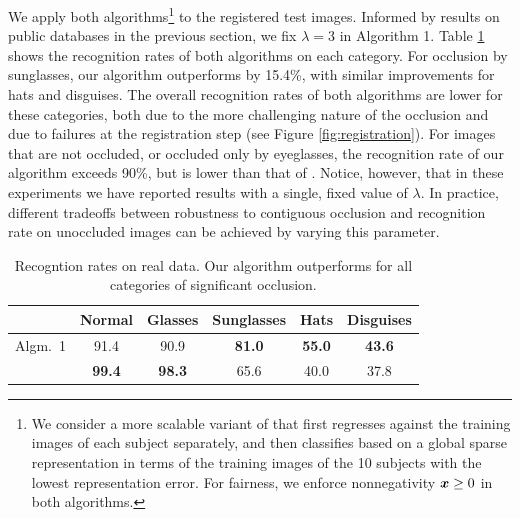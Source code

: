 We apply both algorithms\footnote{We consider a more scalable variant of \cite{Wright2009-PAMI} that first regresses against the training images of each subject separately, and then classifies based on a global sparse representation in terms of the training images of the 10 subjects with the lowest representation error. For fairness, we enforce nonnegativity ${\boldsymbol{x}} \ge 0$ in both algorithms.} to the registered test images. Informed by results on public databases in the previous section, we fix $\lambda = 3$ in Algorithm 1. Table \ref{tab:real-data-rates} shows the recognition rates of both algorithms on each category. For occlusion by sunglasses, our algorithm outperforms \cite{Wright2009-PAMI} by 15.4\%, with similar improvements for hats and disguises. The overall recognition rates of both algorithms are lower for these categories, both due to the more challenging nature of the occlusion and due to failures at the registration step (see Figure \ref{fig:registration}). For images that are not occluded, or occluded only by eyeglasses, the recognition rate of our algorithm exceeds 90\%, but is lower than that of \cite{Wright2009-PAMI}. Notice, however, that in these experiments we have reported results with a single, fixed value of $\lambda$. In practice, different tradeoffs between robustness to contiguous occlusion and recognition rate on unoccluded images can be achieved by varying this parameter.\vspace{0mm}
\begin{table}
\centering
\caption{Recogntion rates on real data. Our algorithm outperforms \cite{Wright2009-PAMI} for all categories of significant occlusion.} \label{tab:real-data-rates}
\begin{tabular}{|c|c|c|c|c|c|}
\hline
& Normal & Glasses & Sunglasses & Hats & Disguises \\
\hline
Algm.\ 1 & 91.4 & 90.9 & {\bf 81.0} & {\bf 55.0} & {\bf 43.6} \\
\hline
\cite{Wright2009-PAMI} & {\bf 99.4} & {\bf 98.3} & 65.6 & 40.0 & 37.8 \\
\hline
\end{tabular}
\end{table}

